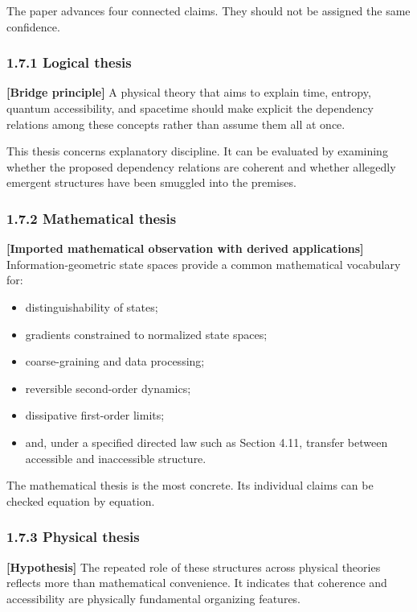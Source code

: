\documentclass[
  11pt,
]{article}
\providecommand{\tightlist}{%
  \setlength{\itemsep}{0pt}\setlength{\parskip}{0pt}}
\begin{document}
The paper advances four connected claims. They should not be assigned
the same confidence.

\subsubsection{1.7.1 Logical thesis}\label{logical-thesis}

\textbf{{[}Bridge principle{]}} A physical theory that aims to explain
time, entropy, quantum accessibility, and spacetime should make explicit
the dependency relations among these concepts rather than assume them
all at once.

This thesis concerns explanatory discipline. It can be evaluated by
examining whether the proposed dependency relations are coherent and
whether allegedly emergent structures have been smuggled into the
premises.

\subsubsection{1.7.2 Mathematical thesis}\label{mathematical-thesis}

\textbf{{[}Imported mathematical observation with derived
applications{]}} Information-geometric state spaces provide a common
mathematical vocabulary for:

\begin{itemize}
\tightlist
\item
  distinguishability of states;
\item
  gradients constrained to normalized state spaces;
\item
  coarse-graining and data processing;
\item
  reversible second-order dynamics;
\item
  dissipative first-order limits;
\item
  and, under a specified directed law such as Section 4.11, transfer
  between accessible and inaccessible structure.
\end{itemize}

The mathematical thesis is the most concrete. Its individual claims can
be checked equation by equation.

\subsubsection{1.7.3 Physical thesis}\label{physical-thesis}

\textbf{{[}Hypothesis{]}} The repeated role of these structures across
physical theories reflects more than mathematical convenience. It
indicates that coherence and accessibility are physically fundamental
organizing features.
\end{document}
